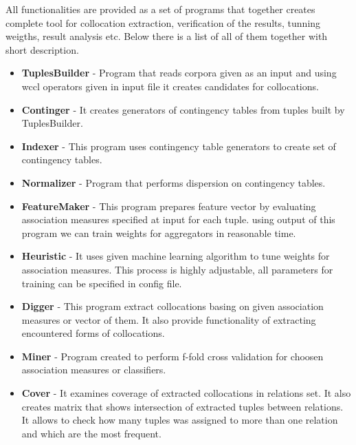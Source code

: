 All functionalities are provided as a set of programs that together creates complete tool for collocation extraction,
verification of the results, tunning weigths, result analysis etc. Below there is a list of all of them together with short description.
\begin{itemize}
    \item \textbf{TuplesBuilder} - Program that reads corpora given as an input and using wccl operators given in input file 
    it creates candidates for collocations.
 
    \item \textbf{Continger} - It creates generators of contingency tables from tuples built by TuplesBuilder.
 
    \item \textbf{Indexer} - This program uses contingency table generators to create set of contingency tables.
 
    \item \textbf{Normalizer} - Program that performs dispersion on contingency tables.
 
    \item \textbf{FeatureMaker} - This program prepares feature vector by evaluating association measures specified at input for each tuple. 
    using output of this program we can train weights for aggregators in reasonable time.
 
    \item \textbf{Heuristic} - It uses given machine learning algorithm to tune weights for association measures. 
    This process is highly adjustable, all parameters for training can be specified in config file.
 
    \item \textbf{Digger} - This program extract collocations basing on given association measures or vector of them. 
    It also provide functionality of extracting encountered forms of collocations.
 
    \item \textbf{Miner} - Program created to perform f-fold cross validation for choosen association measures or classifiers.
    
    \item \textbf{Cover} - It examines coverage of extracted collocations in relations set. It also creates matrix 
    that shows intersection of extracted tuples between relations. It allows to check how many tuples was assigned to more than one relation 
    and which are the most frequent.
 

\end{itemize}
